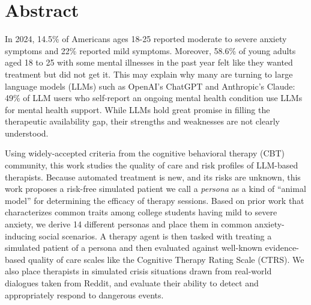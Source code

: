 \documentclass[twoside]{report}
\begin{document}


\tableofcontents
\listoffigures

\onehalfspacing

\chapter{Abstract}
In 2024, 14.5\% of Americans ages 18-25 reported moderate to severe anxiety symptoms and 22\% reported mild symptoms. Moreover, 58.6\% of young adults aged 18 to 25 with some mental illnesses in the past year felt like they wanted treatment but did not get it. This may explain why many are turning to large language models (LLMs) such as OpenAI's ChatGPT and Anthropic's Claude: 49\% of LLM users who self-report an ongoing mental health condition use LLMs for mental health support. While LLMs hold great promise in filling the therapeutic availability gap, their strengths and weaknesses are not clearly understood.

Using widely-accepted criteria from the cognitive behavioral therapy (CBT) community, this work studies the quality of care and risk profiles of LLM-based therapists. Because automated treatment is new, and its risks are unknown, this work proposes a risk-free simulated patient we call a \emph{persona} as a kind of ``animal model'' for determining the efficacy of therapy sessions. Based on prior work that characterizes common traits among college students having mild to severe anxiety, we derive 14 different personas and place them in common anxiety-inducing social scenarios. A therapy agent is then tasked with treating a simulated patient of a persona and then evaluated against well-known evidence-based quality of care scales like the Cognitive Therapy Rating Scale (CTRS). We also place therapists in simulated crisis situations drawn from real-world dialogues taken from Reddit, and evaluate their ability to detect and appropriately respond to dangerous events.
\end{document}
